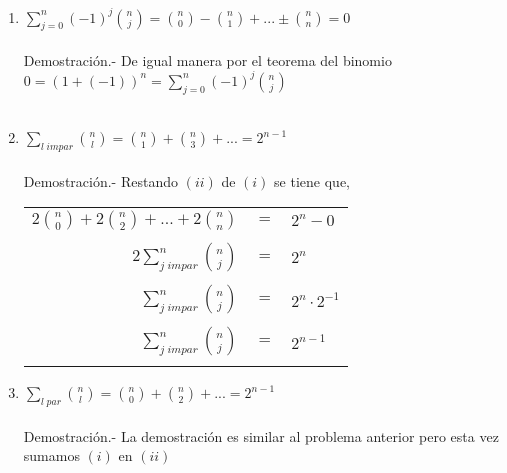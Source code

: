\begin{enumerate}[\bfseries 1.]
\begin{enumerate}[\bfseries (a)]
\begin{enumerate}[\bfseries (i)]
            \item $\displaystyle\sum_{j=0}^n (-1)^j {n \choose j} = {n \choose 0}- {n \choose 1}+...\pm {n \choose n} =0$\\\\
            Demostración.- \;  De igual manera por el teorema del binomio $0=(1+(-1))^n = \sum\limits_{j=0}^n(-1)^j {n \choose j}$\\\\ 

            \item $\displaystyle\sum_{l \; impar} {n \choose l} = {n \choose 1} + {n \choose 3}+ ... = 2^{n-1}$\\\\
            Demostración.- \;  Restando $(ii)$ de $(i)$ se tiene que,
              \begin{center}
                \begin{tabular}{rcl}
                  $2 {n \choose 0} + 2 {n \choose 2} + ... + 2{n \choose n}$&$=$&$2^n - 0$\\\\
                  $2\sum\limits_{j \; impar}^n {n \choose j} $&$=$&$2^n$\\\\ 
                  $\sum\limits_{j \; impar}^n {n \choose j}$&$=$&$2^n \cdot 2^{-1}$\\\\ 
                  $\sum\limits_{j \; impar}^n {n \choose j}$&$=$&$2^{n-1}$\\\\
                \end{tabular}
              \end{center}

            \item $\displaystyle\sum_{l \; par} {n \choose l} = {n \choose 0} + {n \choose 2} + ...  = 2^{n-1}$\\\\
            Demostración.- \; La demostración es similar al problema anterior pero esta vez sumamos $(i)$ en $(ii)$ \\\\ 
            \end{enumerate}
          \end{enumerate}


\end{enumerate}
